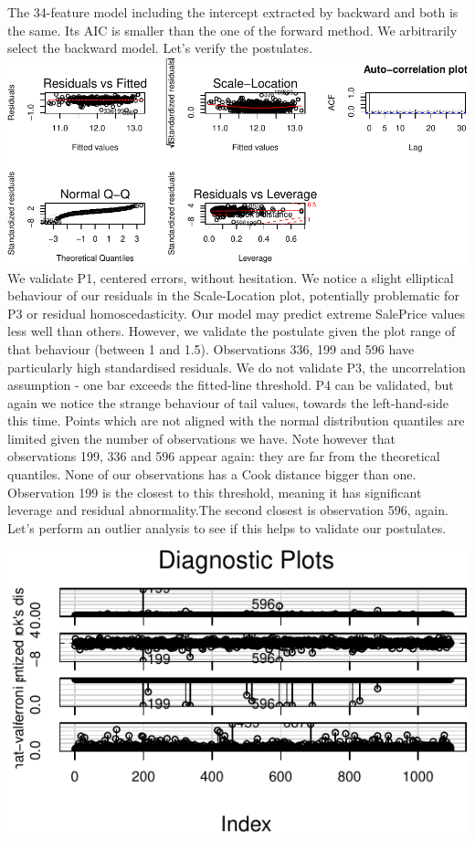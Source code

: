 \documentclass[]{article}
\begin{document}
The 34-feature model including the intercept extracted by backward and
both is the same. Its AIC is smaller than the one of the forward method.
We arbitrarily select the backward model. Let's verify the postulates.\\
\includegraphics{r_file_v5_files/figure-latex/unnamed-chunk-26-1.pdf} We
validate P1, centered errors, without hesitation. We notice a slight
elliptical behaviour of our residuals in the Scale-Location plot,
potentially problematic for P3 or residual homoscedasticity. Our model
may predict extreme SalePrice values less well than others. However, we
validate the postulate given the plot range of that behaviour (between 1
and 1.5). Observations 336, 199 and 596 have particularly high
standardised residuals. We do not validate P3, the uncorrelation
assumption - one bar exceeds the fitted-line threshold. P4 can be
validated, but again we notice the strange behaviour of tail values,
towards the left-hand-side this time. Points which are not aligned with
the normal distribution quantiles are limited given the number of
observations we have. Note however that observations 199, 336 and 596
appear again: they are far from the theoretical quantiles. None of our
observations has a Cook distance bigger than one. Observation 199 is the
closest to this threshold, meaning it has significant leverage and
residual abnormality.The second closest is observation 596, again. Let's
perform an outlier analysis to see if this helps to validate our
postulates.

\begin{center}\includegraphics{r_file_v5_files/figure-latex/unnamed-chunk-27-1} \end{center}
\end{document}
